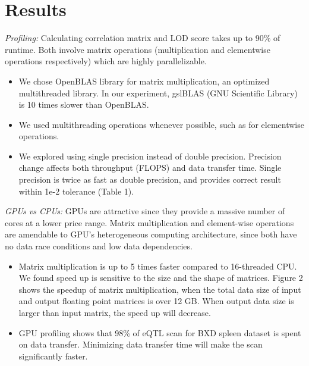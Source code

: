 \documentclass[9pt,twocolumn,twoside,lineno]{gsag3jnl}
\begin{document}
\section{Results}
{\em Profiling:} Calculating correlation matrix and LOD score
takes up to 90\% of runtime.  Both involve matrix operations
(multiplication and elementwise operations respectively) which
are highly parallelizable.
      \begin{itemize}
	\item We chose OpenBLAS library for matrix multiplication, an
	optimized multithreaded library.  In our experiment, gslBLAS
	(GNU Scientific Library) is 10 times slower than OpenBLAS.
	\item We used multithreading operations whenever possible, such as
	for elementwise operations.
	\item We explored using single precision instead of double
	precision.  Precision change affects both throughput (FLOPS) and
	data transfer time.  Single precision is twice
	as fast as double precision, and provides correct result
	within 1e-2 tolerance (Table 1).
\end{itemize}

 {\em GPUs vs CPUs:} GPUs are attractive since they provide a
massive number of cores at a lower price range.
Matrix multiplication and element-wise operations are amendable
to GPU's heterogeneous computing architecture, since both have
no data race conditions and low data dependencies.

\begin{itemize}
	\item Matrix multiplication is up to 5 times faster
	compared to 16-threaded CPU.
	We found speed
	up is sensitive to the size and the shape of matrices.
	Figure 2 shows the speedup of matrix
	multiplication, when the total data size of input and output
	floating point matrices is over 12 GB.
	When output data size is
	larger than input matrix, the speed up will decrease. 
	\item  GPU profiling shows that 98\% of eQTL scan for BXD
	spleen dataset is spent on data transfer.
	Minimizing data transfer time will make the scan significantly
	faster.
\end{itemize}
\end{document}
